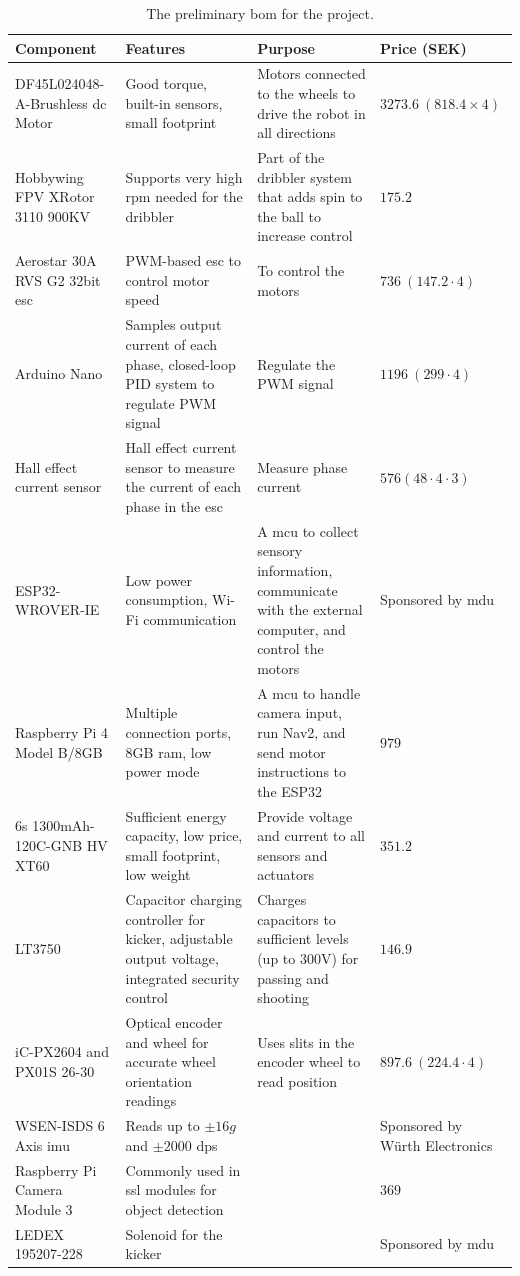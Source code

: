 \begin{table}[H]
    \centering
    \renewcommand{\arraystretch}{1.2} %
    \large %
    \begin{tabularx}{\textwidth}{|X|X|X|X|} \hline
         \textbf{Component} & \textbf{Features} & \textbf{Purpose} & \textbf{Price (SEK)}  \\ \hline
         DF45L024048-A-Brushless \ac{dc} Motor & Good torque, built-in sensors, small footprint & Motors connected to the wheels to drive the robot in all directions & $3273.6\ (818.4 \times 4)$ \\ \hline
         Hobbywing FPV XRotor 3110 900KV & Supports very high \ac{rpm} needed for the dribbler & Part of the dribbler system that adds spin to the ball to increase control & $175.2$\\ \hline
         Aerostar 30A RVS G2 32bit \ac{esc} & PWM-based \ac{esc} to control motor speed & To control the motors & $736\ (147.2 \cdot4)$\\ \hline
         Arduino Nano & Samples output current of each phase, closed-loop PID system to regulate PWM signal & Regulate the PWM signal & $1196\ (299 \cdot4)$ \\ \hline
         Hall effect current sensor & Hall effect current sensor to measure the current of each phase in the \ac{esc} & Measure phase current &$576 (48\cdot4\cdot3)$\\ \hline
         ESP32-WROVER-IE & Low power consumption, Wi-Fi communication & A \ac{mcu} to collect sensory information, communicate with the external computer, and control the motors & Sponsored by \ac{mdu}\\ \hline
         Raspberry Pi 4 Model B/8GB & Multiple connection ports, 8GB \ac{ram}, low power mode & A \ac{mcu} to handle camera input, run Nav2, and send motor instructions to the ESP32 & $979$\\ \hline
         6s 1300mAh-120C-GNB HV XT60 & Sufficient energy capacity, low price, small footprint, low weight & Provide voltage and current to all sensors and actuators & $351.2$\\ \hline
         LT3750 & Capacitor charging controller for kicker, adjustable output voltage, integrated security control & Charges capacitors to sufficient levels (up to 300V) for passing and shooting & $146.9$\\ \hline
         iC-PX2604 and PX01S 26-30 & Optical encoder and wheel for accurate wheel orientation readings & Uses slits in the encoder wheel to read position & $897.6\ (224.4 \cdot4)$\\ \hline
         WSEN-ISDS 6 Axis \ac{imu} & Reads up to $\pm 16g$ and $\pm 2000$ \ac{dps} &  & Sponsored by Würth Electronics\\ \hline
         Raspberry Pi Camera Module 3 & Commonly used in \ac{ssl} modules for object detection &  & $369$\\ \hline
         LEDEX 195207-228 & Solenoid for the kicker &  & Sponsored by \ac{mdu}\\ \hline
    \end{tabularx}
    \caption{The preliminary \acl{bom} for the project.}
    \label{tab:bom}
\end{table}

